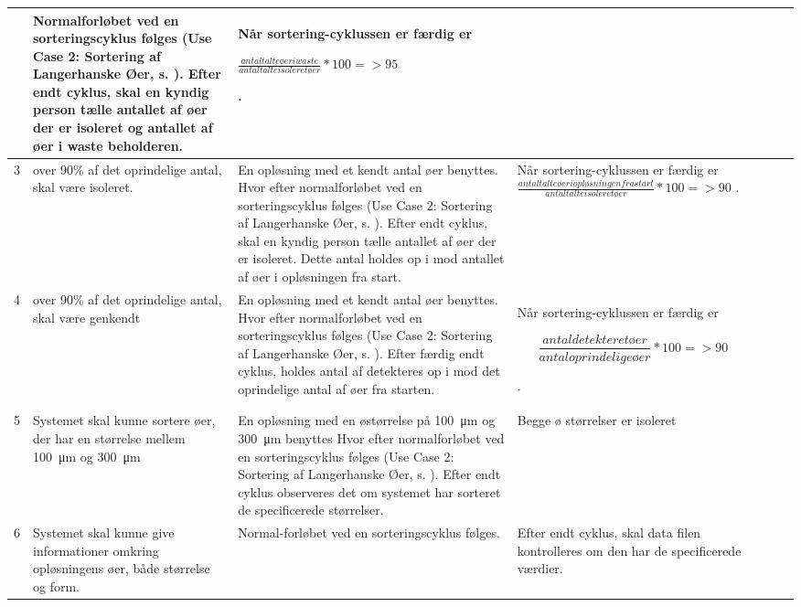 \begin{center}
\begin{longtable}{ | m{1.785cm} | m{1.785cm}| m{1.785cm}| m{1.785cm}| m{1.785cm}| m{1.785cm}|m{1.785cm}| }
 & Normalforløbet ved en sorteringscyklus følges (Use Case 2: Sortering af Langerhanske Øer, s.  \pageref{uc:2}). Efter endt cyklus, skal en kyndig person tælle antallet af øer der er isoleret og antallet af øer i waste beholderen.  & Når sortering-cyklussen er færdig er

 $\frac{antal talte øer i waste}{antal talte isoleret øer}*100= >95$

.   &  & & \\
			\hline		
			
			3 &  over 90\% af det oprindelige antal, skal være isoleret.

   & En opløsning med et kendt antal øer benyttes. Hvor efter normalforløbet ved en sorteringscyklus følges (Use Case 2: Sortering af Langerhanske Øer, s. \pageref{uc:2}). Efter endt cyklus, skal en kyndig person tælle antallet af øer der er isoleret. Dette antal holdes op i mod antallet af øer i opløsningen fra start. & Når sortering-cyklussen er færdig er
 $\frac{antal talte øer i opløsningen fra start}{antal talte isoleret øer}*100= >90$
.   &  & & \\
			\hline		
			
4 &  over 90\% af det oprindelige antal, skal være genkendt
   & En opløsning med et kendt antal øer benyttes. Hvor efter normalforløbet ved en sorteringscyklus følges (Use Case 2: Sortering af Langerhanske Øer, s. \pageref{uc:2}). Efter færdig endt cyklus, holdes antal af detekteres op i mod det oprindelige antal af øer fra starten.
    & Når sortering-cyklussen er færdig er

 $$\frac{antal detekteret øer}{antal oprindelige øer}*100= >90$$

.   &  & & \\
			\hline		
			
			5 &  Systemet skal kunne sortere øer, der har en størrelse mellem  \SI{100}{\micro\metre}  og  \SI{300}{\micro\metre} 
   & En opløsning med en østørrelse på \SI{100}{\micro\metre}  og \SI{300}{\micro\metre} benyttes  Hvor efter normalforløbet ved en sorteringscyklus følges (Use Case 2: Sortering af Langerhanske Øer, s. \pageref{uc:2}). Efter endt cyklus observeres det om systemet har sorteret de specificerede størrelser.
    & Begge ø størrelser er isoleret
    &  & & \\
			\hline			
			
			6 &  Systemet skal kunne give informationer omkring opløsningens øer, både størrelse og form. 
   & Normal-forløbet ved en sorteringscyklus følges. 
    & Efter endt cyklus, skal data filen kontrolleres om den har de specificerede værdier.
    &  & & \\
			\hline	
			
		\end{longtable}
		
	\end{center}
	\pagebreak